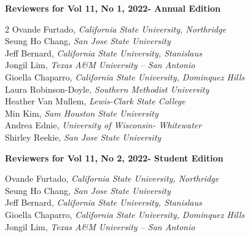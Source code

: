 \documentclass[
  letterpaper,
  DIV=11,
  numbers=noendperiod]{scrartcl}
\begin{document}
\vspace{0.5cm}

\begin{center}
    \textbf{Reviewers for Vol 11, No 1, 2022- Annual Edition}
\end{center}

\begin{multicols}{2}
    Ovande Furtado, \textit{California State University, Northridge} \\
    Seung Ho Chang, \textit{San Jose State University} \\
    Jeff Bernard, \textit{California State University, Stanislaus} \\
    Jongil Lim, \textit{Texas A\&M University -- San Antonio} \\
    Gioella Chaparro, \textit{California State University, Dominquez Hills} \\
    Laura Robinson-Doyle, \textit{Southern Methodist University} \\
    Heather Van Mullem, \textit{Lewis-Clark State College} \\
    Min Kim, \textit{Sam Houston State University} \\
    Andrea Ednie, \textit{University of Wisconsin- Whitewater} \\
    Shirley Reekie, \textit{San Jose State University}
\end{multicols}

\vspace{0.3cm}

\begin{center}
    \textbf{Reviewers for Vol 11, No 2, 2022- Student Edition}
\end{center}

\begin{center}
    Ovande Furtado, \textit{California State University, Northridge} \\
    Seung Ho Chang, \textit{San Jose State University} \\
    Jeff Bernard, \textit{California State University, Stanislaus} \\
    Gioella Chaparro, \textit{California State University, Dominquez Hills} \\
    Jongil Lim, \textit{Texas A\&M University -- San Antonio}
\end{center}
\end{document}
